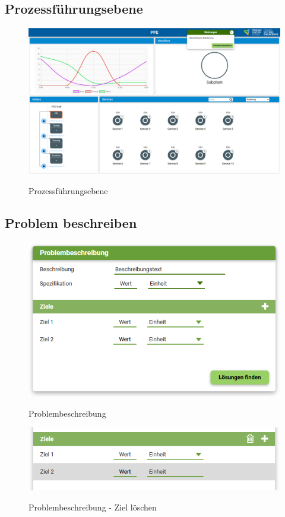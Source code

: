 \subsection{Prozessführungsebene}
\begin{figure}[htbp]
\centering
\includegraphics[angle=90, scale=0.47]{DA_files/Bilder/Konzept/Skizze-PFE.png}
\label{xy}
\caption{Prozessführungsebene}
\end{figure}

\subsection{Problem beschreiben}
\begin{figure}[htbp]
\centering
\includegraphics[scale=0.7]{DA_files/Bilder/Konzept/Skizze-Problem-1.png}
\label{x}
\caption{Problembeschreibung}
\end{figure}

\begin{figure}[htbp]
\centering
\includegraphics[scale=0.7]{DA_files/Bilder/Konzept/Skizze-Problem-2.png}
\label{y}
\caption{Problembeschreibung - Ziel löschen}
\end{figure}


